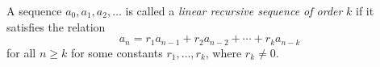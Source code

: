 \begin{dfn}
A sequence $a_0, a_1, a_2, \ldots$ is called a \emph{linear recursive sequence of order} $k$
if it satisfies the relation
\begin{equation}
\label{eqn:LinReck}
a_n = r_1 a_{n-1} + r_2 a_{n-2} + \cdots + r_k a_{n-k}
\end{equation}
for all $n \ge k$ for some constants $r_1, \ldots, r_k$, where $r_k \ne 0$.
\end{dfn}